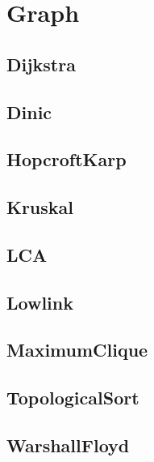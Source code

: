 \section{Graph}


\subsection{Dijkstra}


\subsection{Dinic}


\subsection{HopcroftKarp}



\subsection{Kruskal}


\subsection{LCA}


\subsection{Lowlink}


\subsection{MaximumClique}


\subsection{TopologicalSort}


\subsection{WarshallFloyd}

